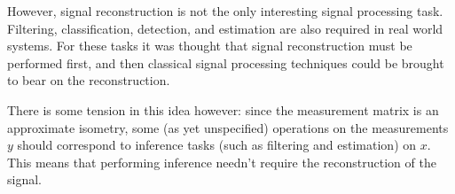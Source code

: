 However, signal reconstruction is not the only interesting signal processing task. Filtering, classification, detection, and estimation are also required in real world systems. For these tasks it was thought that signal reconstruction must be performed first, and then classical signal processing techniques could be brought to bear on the reconstruction. 

There is some tension in this idea however: since the measurement matrix is an approximate isometry, some (as yet unspecified) operations on the measurements \(y\) should correspond to inference tasks (such as filtering and estimation) on \(x\). This means that performing inference needn’t require the reconstruction of the signal. 